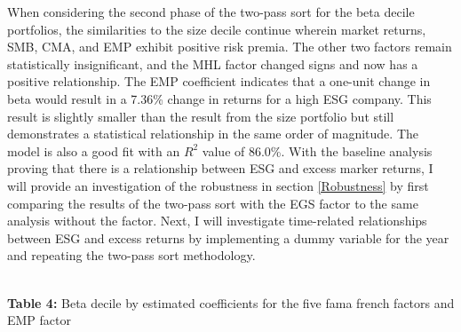 When considering the second phase of the two-pass sort for the beta decile portfolios, the similarities to the size decile continue wherein market returns, SMB, CMA, and EMP exhibit positive risk premia. The other two factors remain statistically insignificant, and the MHL factor changed signs and now has a positive relationship. The EMP coefficient indicates that a one-unit change in beta would result in a 7.36\% change in returns for a high ESG company. This result is slightly smaller than the result from the size portfolio but still demonstrates a statistical relationship in the same order of magnitude. The model is also a good fit with an $R^2$ value of 86.0\%. With the baseline analysis proving that there is a relationship between ESG and excess marker returns, I will provide an investigation of the robustness in section \ref{Robustness} by first comparing the results of the two-pass sort with the EGS factor to the same analysis without the factor. Next, I will investigate time-related relationships between ESG and excess returns by implementing a dummy variable for the year and repeating the two-pass sort methodology.

\begin{center}
    \paperspacingnarrow
    \\
    \textbf{Table 4:} Beta decile by estimated coefficients for the  five fama french factors and EMP factor\\
    \paperspacingwide
\end{center}

